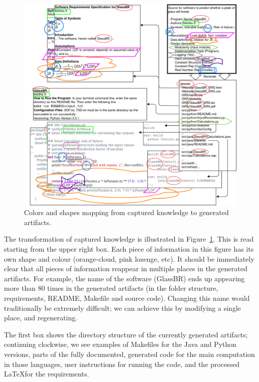 \documentclass[sigconf,review,anonymous=false]{acmart}
\begin{document}
\begin{figure}[t]
  \centering
  \includegraphics[width=\linewidth]{assets/DrasilSupportsChange-right-portrait-overlapped-ungrouped-11ptFont-squished-blind-v1-300dpi.png}
  \caption{Colors and shapes mapping from captured knowledge to generated
  artifacts.}
  \label{Fig_DrasilAndChange}
\end{figure}

The transformation of captured knowledge is illustrated in
Figure~\ref{Fig_DrasilAndChange}. This is read starting from the upper
right box. Each piece of information in this figure has its own
shape and colour (orange-cloud, pink lozenge, etc). It should be immediately clear
that all pieces of information reappear in multiple places in the generated
artifacts. For example, the name of the software (GlassBR) ends up
appearing more than 80 times in the generated artifacts (in the folder
structure, requirements, README, Makefile and source code). Changing this
name would traditionally be extremely difficult; we can achieve this by
modifying a single place, and regenerating.

The first box shows the directory structure of the currently generated artifacts; continuing clockwise, we see examples of Makefiles for
the Java and Python versions, parts of the fully documented, 
generated code for the main computation in those languages, user
instructions for running the code, and the processed \LaTeX for the
requirements.
\end{document}
